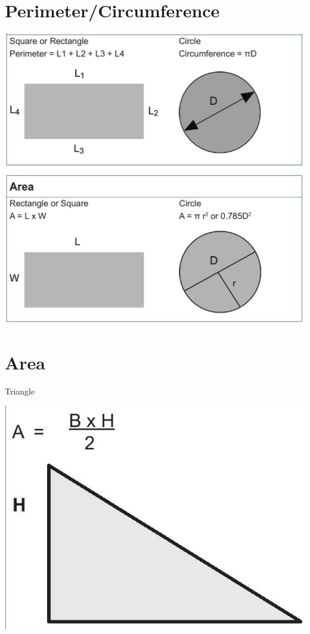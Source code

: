\documentclass[10pt]{article}
\begin{document}
\section{Perimeter/Circumference}
\includegraphics[max width=\textwidth]{2022_09_11_72dbedc910e6e984560cg-01}

\section{Area}
Triangle

\includegraphics[max width=\textwidth]{2022_09_11_72dbedc910e6e984560cg-02}
\end{document}
